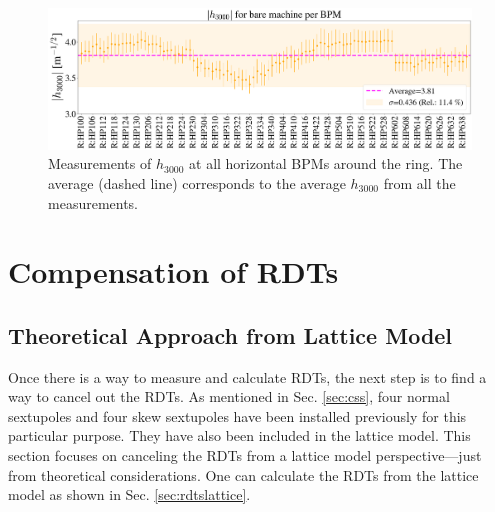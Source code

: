 \begin{figure}[H]
    \centering
    \includegraphics[width=\columnwidth]{chapter4/h3000_bpms.png}
    \caption{Measurements of $h_{3000}$ at all horizontal BPMs around the ring. The average (dashed line) corresponds to the average $h_{3000}$ from all the measurements.}
    \label{fig:h3000_bpms}
\end{figure}

\section{\label{sec:compensate}Compensation of RDTs}

\subsection{Theoretical Approach from Lattice Model}

Once there is a way to measure and calculate RDTs, the next step is to find a way to cancel out the RDTs. As mentioned in Sec. \ref{sec:css}, four normal sextupoles and four skew sextupoles have been installed previously for this particular purpose. They have also been included in the lattice model. This section focuses on canceling the RDTs from a lattice model perspective---just from theoretical considerations. One can calculate the RDTs from the lattice model as shown in Sec. \ref{sec:rdtslattice}.

